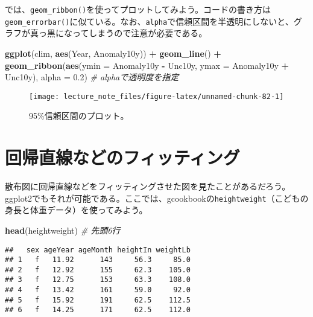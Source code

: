 \documentclass[]{book}
\newenvironment{Shaded}{\begin{snugshade}}{\end{snugshade}}
\newcommand{\KeywordTok}[1]{\textcolor[rgb]{0.13,0.29,0.53}{\textbf{#1}}}
\newcommand{\DataTypeTok}[1]{\textcolor[rgb]{0.13,0.29,0.53}{#1}}
\newcommand{\FloatTok}[1]{\textcolor[rgb]{0.00,0.00,0.81}{#1}}
\newcommand{\StringTok}[1]{\textcolor[rgb]{0.31,0.60,0.02}{#1}}
\newcommand{\CommentTok}[1]{\textcolor[rgb]{0.56,0.35,0.01}{\textit{#1}}}
\newcommand{\OperatorTok}[1]{\textcolor[rgb]{0.81,0.36,0.00}{\textbf{#1}}}
\newcommand{\NormalTok}[1]{#1}
\begin{document}
では、\texttt{geom\_ribbon()}を使ってプロットしてみよう。コードの書き方は\texttt{geom\_errorbar()}に似ている。なお、\texttt{alpha}で信頼区間を半透明にしないと、グラフが真っ黒になってしまうので注意が必要である。



\begin{Shaded}
\begin{Highlighting}[]
\KeywordTok{ggplot}\NormalTok{(clim, }\KeywordTok{aes}\NormalTok{(Year, Anomaly10y)) }\OperatorTok{+}
\StringTok{  }\KeywordTok{geom_line}\NormalTok{() }\OperatorTok{+}
\StringTok{  }\KeywordTok{geom_ribbon}\NormalTok{(}\KeywordTok{aes}\NormalTok{(}\DataTypeTok{ymin =}\NormalTok{ Anomaly10y }\OperatorTok{-}\StringTok{ }\NormalTok{Unc10y, }\DataTypeTok{ymax =}\NormalTok{ Anomaly10y }\OperatorTok{+}\StringTok{ }\NormalTok{Unc10y), }\DataTypeTok{alpha =} \FloatTok{0.2}\NormalTok{) }\CommentTok{# alphaで透明度を指定}
\end{Highlighting}
\end{Shaded}

\begin{figure}

{\centering \texttt{[image: lecture\_note\_files/figure-latex/unnamed-chunk-82-1]} 

}

\caption{95\%信頼区間のプロット。}\label{fig:unnamed-chunk-82}
\end{figure}

\section{回帰直線などのフィッティング}

散布図に回帰直線などをフィッティングさせた図を見たことがあるだろう。ggplot2でもそれが可能である。ここでは、gcookbookの\texttt{heightweight}（こどもの身長と体重データ）を使ってみよう。

\begin{Shaded}
\begin{Highlighting}[]
\KeywordTok{head}\NormalTok{(heightweight) }\CommentTok{# 先頭6行}
\end{Highlighting}
\end{Shaded}

\begin{verbatim}
##   sex ageYear ageMonth heightIn weightLb
## 1   f   11.92      143     56.3     85.0
## 2   f   12.92      155     62.3    105.0
## 3   f   12.75      153     63.3    108.0
## 4   f   13.42      161     59.0     92.0
## 5   f   15.92      191     62.5    112.5
## 6   f   14.25      171     62.5    112.0
\end{verbatim}
\end{document}
